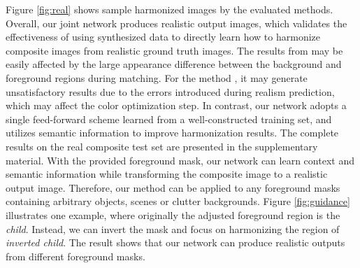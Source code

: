 \documentclass[10pt,twocolumn,letterpaper]{article}
\begin{document}
%
Figure \ref{fig:real} shows sample harmonized images by the evaluated methods.
%
Overall, our joint network produces realistic output images, which validates the effectiveness of using synthesized data to directly learn how to harmonize composite images from realistic ground truth images. 
%
The results from \cite{Xue_siggraph_2012} may be easily affected by the large appearance difference between the background and foreground regions during matching.
%
For the method \cite{Zhu_ICCV_2015}, it may generate unsatisfactory results due to the errors introduced during realism prediction, which may affect the color optimization step.
%
In contrast, our network adopts a single feed-forward scheme learned from a well-constructed training set, and utilizes semantic information to improve harmonization results.
%
The complete results on the real composite test set are presented in the supplementary material.
%
%
{}
%
With the provided foreground mask, our network can learn context and semantic information while transforming the composite image to a realistic output image.
%
Therefore, our method can be applied to any foreground masks containing arbitrary objects, scenes or clutter backgrounds.
%
Figure \ref{fig:guidance} illustrates one example, where originally the adjusted foreground region is the \textit{child}.
%
Instead, we can invert the mask and focus on harmonizing the region of \textit{inverted child}.
%
The result shows that our network can produce realistic outputs from different foreground masks.
%
\end{document}
